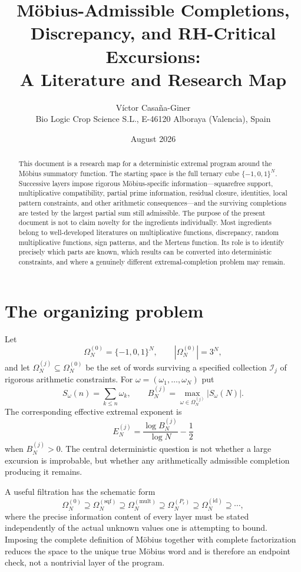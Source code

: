 \documentclass[11pt]{article}
\title{Möbius-Admissible Completions, Discrepancy, and RH-Critical Excursions:\\A Literature and Research Map}
\author{Víctor Casaña-Giner\\Bio Logic Crop Science S.L., E-46120 Alboraya (Valencia), Spain}
\date{August 2026}
\newcommand{\Om}{\Omega}
\begin{document}
\maketitle

\begin{abstract}
This document is a research map for a deterministic extremal program around the Möbius summatory function.  The starting space is the full ternary cube $\{-1,0,1\}^N$.  Successive layers impose rigorous Möbius-specific information---squarefree support, multiplicative compatibility, partial prime information, residual closure, identities, local pattern constraints, and other arithmetic consequences---and the surviving completions are tested by the largest partial sum still admissible.  The purpose of the present document is not to claim novelty for the ingredients individually.  Most ingredients belong to well-developed literatures on multiplicative functions, discrepancy, random multiplicative functions, sign patterns, and the Mertens function.  Its role is to identify precisely which parts are known, which results can be converted into deterministic constraints, and where a genuinely different extremal-completion problem may remain.
\end{abstract}

\section{The organizing problem}
Let
\[
 \Om_N^{(0)}=\{-1,0,1\}^N,\qquad |\Om_N^{(0)}|=3^N,
\]
and let $\Om_N^{(j)}\subseteq\Om_N^{(0)}$ be the set of words surviving a specified collection $\mathcal I_j$ of rigorous arithmetic constraints.  For $\omega=(\omega_1,\ldots,\omega_N)$ put
\[
 S_\omega(n)=\sum_{k\le n}\omega_k,
 \qquad
 B_N^{(j)}=\max_{\omega\in\Om_N^{(j)}}|S_\omega(N)|.
\]
The corresponding effective extremal exponent is
\[
 E_N^{(j)}=\frac{\log B_N^{(j)}}{\log N}-\frac12
\]
when $B_N^{(j)}>0$.  The central deterministic question is not whether a large excursion is improbable, but whether any arithmetically admissible completion producing it remains.

A useful filtration has the schematic form
\[
\Om_N^{(0)}\supseteq
\Om_N^{(\mathrm{sqf})}\supseteq
\Om_N^{(\mathrm{mult})}\supseteq
\Om_N^{(P_r)}\supseteq
\Om_N^{(\mathrm{id})}\supseteq\cdots,
\]
where the precise information content of every layer must be stated independently of the actual unknown values one is attempting to bound.  Imposing the complete definition of Möbius together with complete factorization reduces the space to the unique true Möbius word and is therefore an endpoint check, not a nontrivial layer of the program.
\end{document}
